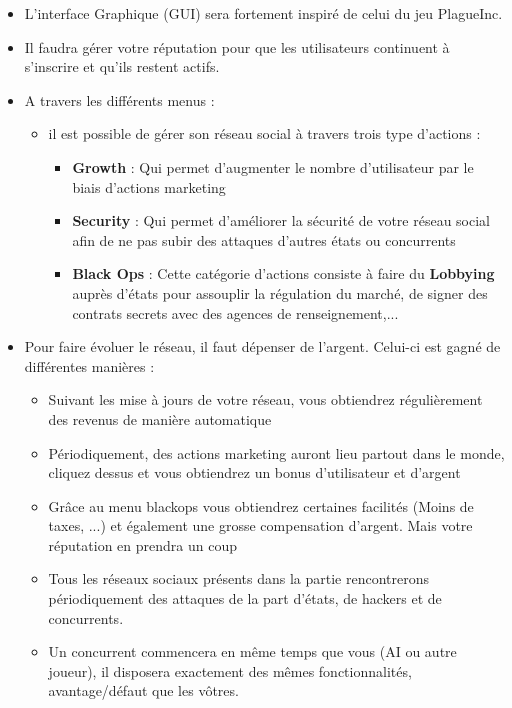 \begin{itemize}
    \item L'interface Graphique (GUI) sera fortement inspiré de celui du jeu PlagueInc. 
    
    \item Il faudra gérer votre réputation pour que les utilisateurs continuent à s'inscrire et qu'ils restent actifs.
    
    \item A travers les différents menus :
    
    \begin{itemize}
        \item il est possible de gérer son réseau social à travers trois type d'actions :
    
        \begin{itemize}
            \item \textbf{Growth} : Qui permet d'augmenter le nombre d'utilisateur par le biais d'actions marketing
            \item \textbf{Security} : Qui permet d'améliorer la sécurité de votre réseau social afin de ne pas subir des attaques d'autres états ou concurrents
            \item \textbf{Black Ops} : Cette catégorie d'actions consiste à faire du \textbf{Lobbying} auprès d'états pour assouplir la régulation du marché, de signer des contrats secrets avec des agences de renseignement,...
        \end{itemize}
        \end{itemize}
        \item Pour faire évoluer le réseau, il faut dépenser de l'argent. Celui-ci est gagné de différentes manières : 
        \begin{itemize}
            \item Suivant les mise à jours de votre réseau, vous obtiendrez régulièrement des revenus de manière automatique
            \item Périodiquement, des actions marketing auront lieu partout dans le monde, cliquez dessus et vous obtiendrez un bonus d'utilisateur et d'argent
            \item Grâce au menu blackops vous obtiendrez certaines facilités (Moins de taxes, ...) et également une grosse compensation d'argent. Mais votre réputation en prendra un coup
        \item Tous les réseaux sociaux présents dans la partie rencontrerons périodiquement des attaques de la part d'états, de hackers et de concurrents.
        \item Un concurrent commencera en même temps que vous (AI ou autre joueur), il disposera exactement des mêmes fonctionnalités, avantage/défaut que les vôtres.
    \end{itemize}
\end{itemize}


